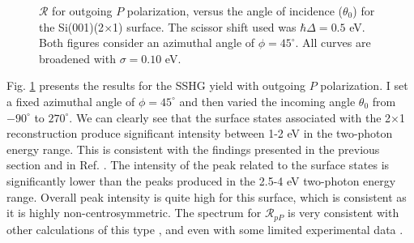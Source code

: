 \begin{figure}[H]
\centering
{}\hfill
{}
\caption{$\mathcal{R}$ for outgoing $P$ polarization, versus the angle of
incidence ($\theta_{0}$) for the Si(001)(2$\times$1) surface. The scissor shift
used was $\hbar\Delta = 0.5$ eV. Both figures consider an azimuthal angle of
$\phi = 45^{\circ}$. All curves are broadened with $\sigma = 0.10$ eV.}
\label{fig:2x1rP3d}
\end{figure}

Fig. \ref{fig:2x1rP3d} presents the results for the SSHG yield with outgoing $P$
polarization. I set a fixed azimuthal angle of $\phi = 45^{\circ}$ and then
varied the incoming angle $\theta_{0}$ from $-90^{\circ}$ to $270^{\circ}$. We
can clearly see that the surface states associated with the 2$\times$1
reconstruction produce significant intensity between 1-2 eV in the two-photon
energy range. This is consistent with the findings presented in the previous
section and in Ref. \cite{andersonPRB15}. The intensity of the peak related to
the surface states is significantly lower than the peaks produced in the 2.5-4
eV two-photon energy range. Overall peak intensity is quite high for this
surface, which is consistent as it is highly non-centrosymmetric. The spectrum
for $\mathcal{R}_{pP}$ is very consistent with other calculations of this type
\cite{tancognedejean:tel-01235611}, and even with some limited experimental data
\cite{powerPRL95}.

